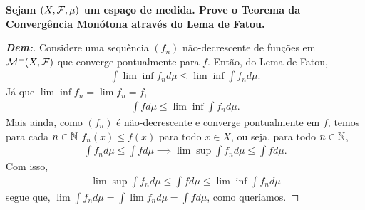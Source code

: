 \biglinend 
\newpage
{}
\myexe{\thetres}
\bigline
\textbf{Sejam $(X, \mathcal F, \mu)$ um espaço de medida. Prove o 
Teorema da Convergência Monótona através do Lema de Fatou.}
\begin{proof}[\textbf{Dem:}] Considere uma sequência $(f_n)$ não-decrescente 
  de funções em $\mathcal M^+ (X, \mathcal F)$ que converge pontualmente para $f$. 
  Então, do Lema de Fatou, 
  \begin{align*}
    \int \lim\inf f_n d\mu \le \lim\inf\int f_n d\mu.  
  \end{align*}
Já que $\lim\inf f_n=\lim f_n=f$,
\begin{align*}
  \int f d\mu \le \lim\inf\int f_n d\mu.
\end{align*}
  Mais ainda, como $(f_n)$ é não-decrescente e converge pontualmente em $f$, 
  temos para  cada $n \in \mathbb N$ $f_n(x) \le f(x)$ para todo $x \in X$, ou seja, para todo 
  $n \in \mathbb N$, 
\begin{align*}
  \int f_n d\mu \le \int f d\mu \implies \lim\sup \int f_n d\mu \le \int f d\mu.
\end{align*}
Com isso, 
\begin{align*}
  \lim \sup \int f_n d\mu \le \int f d\mu \le \lim \inf \int f_n d\mu
\end{align*}
segue que, $\lim \int f_n d\mu = \int \lim f_n d\mu = \int f d\mu$, 
como queríamos.
\end{proof}

